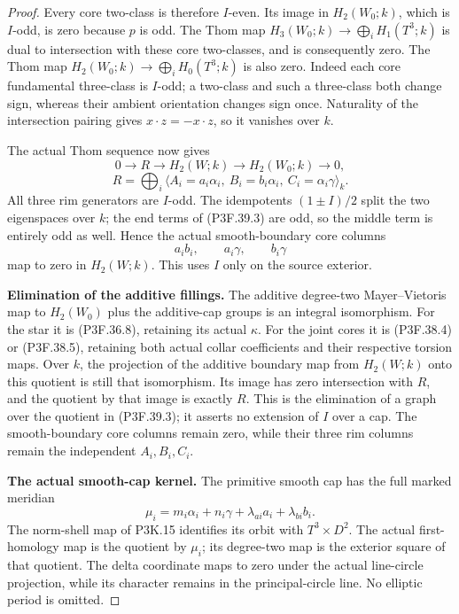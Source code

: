 \begin{proof}
Every core two-class is therefore \(I\)-even. Its image in
\(H_2(W_0;k)\), which is \(I\)-odd, is zero because \(p\)
is odd. The Thom map
\(H_3(W_0;k)\to\bigoplus_iH_1(T^3;k)\) is dual to
intersection with these core two-classes, and is consequently
zero. The Thom map
\(H_2(W_0;k)\to\bigoplus_iH_0(T^3;k)\) is also zero.
Indeed each core fundamental three-class is \(I\)-odd; a two-class
and such a three-class both change sign, whereas their ambient
orientation changes sign once. Naturality of the intersection
pairing gives \(x\cdot z=-x\cdot z\), so it vanishes over
\(k\).

The actual Thom sequence now gives
\[
 0\longrightarrow R\longrightarrow H_2(W;k)
          \longrightarrow H_2(W_0;k)\longrightarrow0,
\]
\[
 R=\bigoplus_i\langle
 A_i=a_i\alpha_i,\ B_i=b_i\alpha_i,\ C_i=\alpha_i\gamma
 \rangle_k.                                                   \tag{P3F.39.3}
\]
All three rim generators are \(I\)-odd. The idempotents
\((1\pm I)/2\) split the two eigenspaces over \(k\); the
end terms of (P3F.39.3) are odd, so the middle term is entirely
odd as well. Hence the actual smooth-boundary core columns
\[
                      a_ib_i,\qquad a_i\gamma,\qquad b_i\gamma
\]
map to zero in \(H_2(W;k)\). This uses \(I\) only on the
source exterior.

\par\medskip\noindent\textbf{Elimination of the additive fillings.}
The additive degree-two Mayer--Vietoris map to
\(H_2(W_0)\) plus the additive-cap groups is an integral
isomorphism. For the star it is (P3F.36.8), retaining its actual
\(\kappa\). For the joint cores it is (P3F.38.4) or
(P3F.38.5), retaining both actual collar coefficients and their
respective torsion maps. Over \(k\), the projection of the
additive boundary map from \(H_2(W;k)\) onto this quotient is
still that isomorphism. Its image has zero intersection with
\(R\), and the quotient by that image is exactly \(R\).
This is the elimination of a graph over the quotient in
(P3F.39.3); it asserts no extension of \(I\) over a cap.
The smooth-boundary core columns remain zero, while their three
rim columns remain the independent \(A_i,B_i,C_i\).

\par\medskip\noindent\textbf{The actual smooth-cap kernel.}
The primitive smooth cap has the full marked meridian
\[
 \mu_i=m_i\alpha_i+n_i\gamma+
                         \lambda_{ai}a_i+\lambda_{bi}b_i.
\]
The norm-shell map of P3K.15 identifies its orbit with
\(T^3\times D^2\). The actual first-homology map is the
quotient by \(\mu_i\); its degree-two map is the exterior
square of that quotient. The delta coordinate maps to zero under
the actual line-circle projection, while its character remains
in the principal-circle line. No elliptic period is omitted.


\end{proof}
